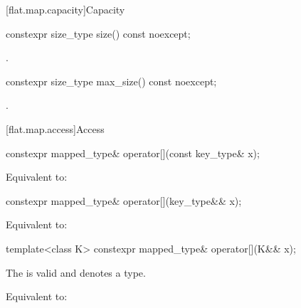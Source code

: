 [flat.map.capacity]{Capacity}

%
\begin{itemdecl}
constexpr size_type size() const noexcept;
\end{itemdecl}

\begin{itemdescr}
\pnum
\returns
{}.
\end{itemdescr}

%
\begin{itemdecl}
constexpr size_type max_size() const noexcept;
\end{itemdecl}

\begin{itemdescr}
\pnum
\returns
{}.
\end{itemdescr}

[flat.map.access]{Access}

%
\begin{itemdecl}
constexpr mapped_type& operator[](const key_type& x);
\end{itemdecl}

\begin{itemdescr}
\pnum
\effects
Equivalent to: 
\end{itemdescr}

%
\begin{itemdecl}
constexpr mapped_type& operator[](key_type&& x);
\end{itemdecl}

\begin{itemdescr}
\pnum
\effects
Equivalent to: 
\end{itemdescr}

%
\begin{itemdecl}
template<class K> constexpr mapped_type& operator[](K&& x);
\end{itemdecl}

\begin{itemdescr}
\pnum
\constraints
The   is valid and
denotes a type.

\pnum
\effects
Equivalent to: 
\end{itemdescr}

